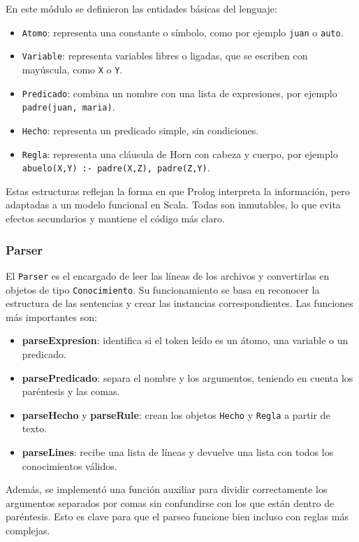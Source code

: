 En este módulo se definieron las entidades básicas del lenguaje:
\begin{itemize}
  \item \texttt{Atomo}: representa una constante o símbolo, como por ejemplo \texttt{juan} o \texttt{auto}.
  \item \texttt{Variable}: representa variables libres o ligadas, que se escriben con mayúscula, como \texttt{X} o \texttt{Y}.
  \item \texttt{Predicado}: combina un nombre con una lista de expresiones, por ejemplo \texttt{padre(juan, maria)}.
  \item \texttt{Hecho}: representa un predicado simple, sin condiciones.
  \item \texttt{Regla}: representa una cláusula de Horn con cabeza y cuerpo, por ejemplo \texttt{abuelo(X,Y) :- padre(X,Z), padre(Z,Y)}.
\end{itemize}

Estas estructuras reflejan la forma en que Prolog interpreta la información, pero adaptadas a un modelo funcional en Scala.  
Todas son inmutables, lo que evita efectos secundarios y mantiene el código más claro.

\subsubsection{Parser}

El \texttt{Parser} es el encargado de leer las líneas de los archivos y convertirlas en objetos de tipo \texttt{Conocimiento}.  
Su funcionamiento se basa en reconocer la estructura de las sentencias y crear las instancias correspondientes.  
Las funciones más importantes son:

\begin{itemize}
  \item \textbf{parseExpresion}: identifica si el token leído es un átomo, una variable o un predicado.
  \item \textbf{parsePredicado}: separa el nombre y los argumentos, teniendo en cuenta los paréntesis y las comas.
  \item \textbf{parseHecho} y \textbf{parseRule}: crean los objetos \texttt{Hecho} y \texttt{Regla} a partir de texto.
  \item \textbf{parseLines}: recibe una lista de líneas y devuelve una lista con todos los conocimientos válidos.
\end{itemize}

Además, se implementó una función auxiliar para dividir correctamente los argumentos separados por comas sin confundirse con los que están dentro de paréntesis.  
Esto es clave para que el parseo funcione bien incluso con reglas más complejas.

